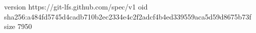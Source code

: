 version https://git-lfs.github.com/spec/v1
oid sha256:a484fd5745d4cadb710b2ec2334e4c2f2adcf4b4ed339559aca5d59d8675b73f
size 7950
